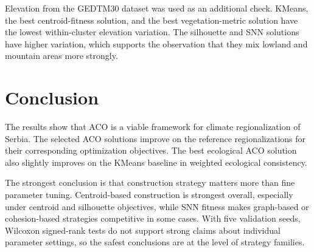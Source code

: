 \documentclass[11pt]{article}
\begin{document}
Elevation from the GEDTM30 dataset was used as an additional check. KMeans, the best centroid-fitness solution, and the best vegetation-metric solution have the lowest within-cluster elevation variation. The silhouette and SNN solutions have higher variation, which supports the observation that they mix lowland and mountain areas more strongly.

\section*{Conclusion}

The results show that ACO is a viable framework for climate regionalization of Serbia. The selected ACO solutions improve on the reference regionalizations for their corresponding optimization objectives. The best ecological ACO solution also slightly improves on the KMeans baseline in weighted ecological consistency.

The strongest conclusion is that construction strategy matters more than fine parameter tuning. Centroid-based construction is strongest overall, especially under centroid and silhouette objectives, while SNN fitness makes graph-based or cohesion-based strategies competitive in some cases. With five validation seeds, Wilcoxon signed-rank tests do not support strong claims about individual parameter settings, so the safest conclusions are at the level of strategy families.
\end{document}

